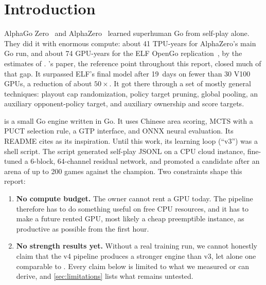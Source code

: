 \section{Introduction}\label{sec:intro}

AlphaGo Zero~\citep{silver2017mastering} and AlphaZero~\citep{silver2018general} learned
superhuman Go from self-play alone. They did it with enormous compute: about 41 TPU-years
for AlphaZero's main Go run, and about 74 GPU-years for the ELF OpenGo
replication~\citep{tian2019elf}, by the estimates of \citet{wu2019accelerating}.
\citeauthor{wu2019accelerating}'s \katago{} paper, the reference point throughout this
report, closed much of that gap. It surpassed ELF's final model after 19~days on fewer
than 30 V100 GPUs, a reduction of about $50\times$. It got there through a set of mostly
general techniques: playout cap randomization, policy target pruning, global pooling, an
auxiliary opponent-policy target, and auxiliary ownership and score targets.

\gofer{} is a small Go engine written in Go. It uses Chinese area scoring, MCTS with a
PUCT selection rule, a GTP interface, and ONNX neural evaluation. Its README cites
\katago{} as its inspiration. Until this work, its learning loop (``v3'') was a shell
script. The script generated self-play JSONL on a CPU cloud instance, fine-tuned a
6-block, 64-channel residual network, and promoted a candidate after an arena of up to 200 games
against the champion. Two constraints shape this report:
\begin{enumerate}
  \item \textbf{No compute budget.} The owner cannot rent a GPU today. The pipeline therefore has
        to do something useful on free CPU resources, and it has to make a future rented
        GPU, most likely a cheap preemptible instance, as productive as possible from the
        first hour.
  \item \textbf{No strength results yet.} Without a real training run, we cannot honestly claim
        that the v4 pipeline produces a stronger engine than v3, let alone one comparable to
        \katago{}. Every claim below is limited to what we measured or can derive, and
        \cref{sec:limitations} lists what remains untested.
\end{enumerate}

